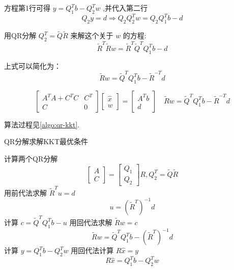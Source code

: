 方程第1行可得 $ y=Q_{1}^{T} b-Q_{2}^{T} w $ ,并代入第二行
\begin{equation}
Q_{2} y=d \Rightarrow Q_{2} Q_{2}^{T} w=Q_{2} Q_{1}^{T} b-d
\end{equation}

用QR分解 $ Q_{2}^{T}=\tilde{Q} \tilde{R} $ 来解这个关于 $ w $ 的方程:
\begin{equation}
\tilde{R}^{T} \tilde{R} w=\tilde{R}^{T} \tilde{Q}^{T} Q_{1}^{T} b-d
\end{equation}

上式可以简化为：
\begin{equation}
\tilde{R} w=\tilde{Q}^{T} Q_{1}^{T} b-\tilde{R}^{-T} d
\end{equation}

\begin{equation} \left[\begin{array}{cc}A^{T} A+C^{T} C & C^{T} \\ C & 0\end{array}\right]\left[\begin{array}{c}\hat{x} \\ w\end{array}\right]=\left[\begin{array}{c}A^{T} b \\ d\end{array}\right] \quad \tilde{R} w=\tilde{Q}^{T} Q_{1}^{T} b-\tilde{R}^{-T} d \end{equation}

算法过程见\ref{algo:qr-kkt}.

\begin{algorithm}[htbp]
    \caption{QR分解求解KKT最优条件}
    \label{algo:qr-kkt}
    计算两个QR分解
\begin{equation}
\left[\begin{array}{l}
A\\
C
\end{array}\right]=\left[\begin{array}{l}
Q_{1} \\
Q_{2}
\end{array}\right] R, Q_{2}^{T}=\tilde{Q} \tilde{R}
\end{equation}\;
用前代法求解 $ \tilde{R}^{T} u=d $
\begin{equation}u= (\tilde{R}^{T})^{-1} d\end{equation}
\;
计算 $ c=\tilde{Q}^{T} Q_{1}^{T} b-u $\;
用回代法求解 $ \tilde{R} w=c $ 
\begin{equation}\tilde{R} w = \tilde{Q}^{T} Q_{1}^{T} b- (\tilde{R}^{T})^{-1} d\end{equation}\;
计算 $ y=Q_{1}^{T} b-Q_{2}^{T} w $\;
用回代法计算 $ R \hat{x}=y $
\begin{equation}R \hat{x}=Q_{1}^{T} b-Q_{2}^{T} w\end{equation}
\;

\end{algorithm}

